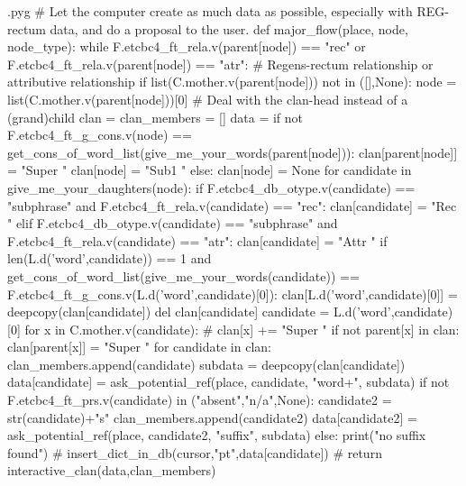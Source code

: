 \documentclass{report}
\makeatletter
\newenvironment{python}{%
  \VerbatimEnvironment
  \minted@resetoptions
  \setkeys{minted@opt}{}
      \begin{VerbatimOut}{\jobname.pyg}}
{%
      \end{VerbatimOut}
      \minted@pygmentize{python}
      \DeleteFile{\jobname.pyg}}
\makeatother
\begin{document}
\begin{python}
# Let the computer create as much data as possible, especially with REG-rectum data, and do a proposal to the user.
def major_flow(place, node, node_type):
    while F.etcbc4_ft_rela.v(parent[node]) == "rec" or F.etcbc4_ft_rela.v(parent[node]) == "atr": # Regens-rectum relationship or attributive relationship
        if list(C.mother.v(parent[node])) not in ([],None):
            node = list(C.mother.v(parent[node]))[0] # Deal with the clan-head instead of a (grand)child
    clan = {}
    clan_members = []
    data = {}
    if not F.etcbc4_ft_g_cons.v(node) == get_cons_of_word_list(give_me_your_words(parent[node])):
        clan[parent[node]] = "Super "
        clan[node] = "Sub1 "
    else:
        clan[node] = None
    for candidate in give_me_your_daughters(node):
        if F.etcbc4_db_otype.v(candidate) == "subphrase" and F.etcbc4_ft_rela.v(candidate) == "rec":
            clan[candidate] = "Rec "
        elif F.etcbc4_db_otype.v(candidate) == "subphrase" and F.etcbc4_ft_rela.v(candidate) == "atr":
            clan[candidate] = "Attr "
        if len(L.d('word',candidate)) == 1 and get_cons_of_word_list(give_me_your_words(candidate)) == F.etcbc4_ft_g_cons.v(L.d('word',candidate)[0]):
            clan[L.d('word',candidate)[0]] = deepcopy(clan[candidate])
            del clan[candidate]
            candidate = L.d('word',candidate)[0] 
        for x in C.mother.v(candidate):
#            clan[x] += "Super "
            if not parent[x] in clan:
                clan[parent[x]] = "Super "
    for candidate in clan:
        clan_members.append(candidate)
        subdata = deepcopy(clan[candidate])
        data[candidate] = ask_potential_ref(place, candidate, "word+", subdata)
        if not F.etcbc4_ft_prs.v(candidate) in ("absent","n/a",None):
            candidate2 = str(candidate)+"s"
            clan_members.append(candidate2)
            data[candidate2] = ask_potential_ref(place, candidate2, "suffix", subdata)
        else:
            print("no suffix found")
#    insert_dict_in_db(cursor,"pt",data[candidate])
#    return
    interactive_clan(data,clan_members)

\end{python}
\end{document}
